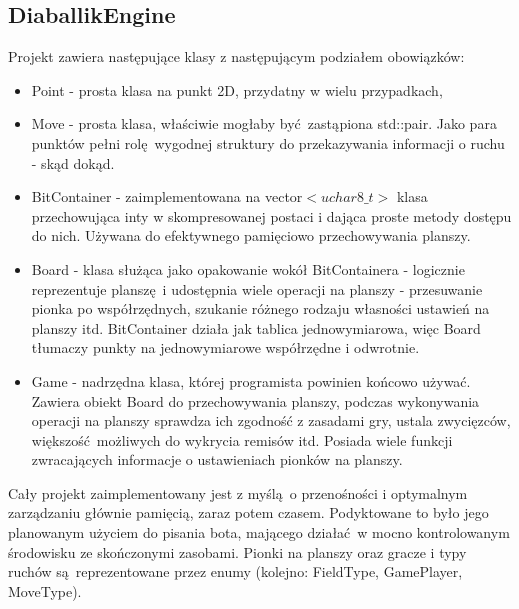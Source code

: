 \documentclass[a4paper,12pt]{article}
\begin{document}
\subsection*{DiaballikEngine}
Projekt zawiera następujące klasy z następującym podziałem obowiązków:
\begin{itemize}
 \item Point - prosta klasa na punkt 2D, przydatny w wielu przypadkach,
 \item Move - prosta klasa, właściwie mogłaby być zastąpiona std::pair. Jako para punktów pełni rolę wygodnej struktury do przekazywania informacji
 o ruchu - skąd dokąd.
 \item BitContainer - zaimplementowana na vector$<uchar8\_t>$ klasa przechowująca inty w skompresowanej postaci i dająca proste metody dostępu do nich.
 Używana do efektywnego pamięciowo przechowywania planszy.
 \item Board - klasa służąca jako opakowanie wokół BitContainera - logicznie reprezentuje planszę i udostępnia wiele operacji na planszy - 
 przesuwanie pionka po współrzędnych, szukanie różnego rodzaju własności ustawień na planszy itd. BitContainer działa jak tablica jednowymiarowa, więc
 Board tłumaczy punkty na jednowymiarowe współrzędne i odwrotnie.
 \item Game - nadrzędna klasa, której programista powinien końcowo używać. Zawiera obiekt Board do przechowywania planszy, podczas wykonywania
 operacji na planszy sprawdza ich zgodność z zasadami gry, ustala zwycięzców, większość możliwych do wykrycia remisów itd. Posiada wiele funkcji
 zwracających informacje o ustawieniach pionków na planszy.
\end{itemize}
Cały projekt zaimplementowany jest z myślą o przenośności i optymalnym zarządzaniu głównie pamięcią, zaraz potem czasem. Podyktowane to było jego
planowanym użyciem do pisania bota, mającego działać w mocno kontrolowanym środowisku ze skończonymi zasobami.
Pionki na planszy oraz gracze i typy ruchów są reprezentowane przez enumy (kolejno: FieldType, GamePlayer, MoveType).
\end{document}
